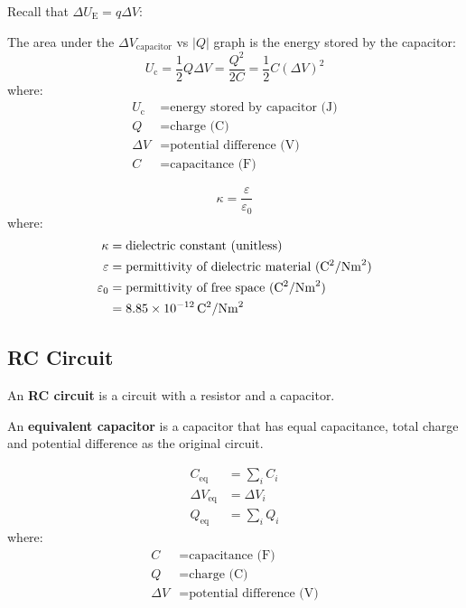\documentclass{article}
\newcommand{\definition}[1]{\begin{tcolorbox}[colback=red!5!white,colframe=red!75!black,parbox=false] #1 \end{tcolorbox}}
\newcommand{\theorem}[2]{\begin{tcolorbox}[title={#1},colback=blue!5!white,colframe=blue!75!black,parbox=false] #2 \end{tcolorbox}}
\begin{document}
Recall that $\Delta U_\text{E}=q\Delta V$:
\theorem{Energy of capacitor}{
	The area under the $\Delta V_\text{capacitor}$ vs $\left|Q\right|$ graph is the energy stored by the capacitor:
	\begin{equation*}
		U_\text{c}
		=\frac12 Q\Delta V
		=\frac{Q^2}{2C}
		=\frac12 C(\Delta V)^2
	\end{equation*}
	where:
	\begin{align*}
		U_\text{c}&=\text{energy stored by capacitor (J)} \\
		Q&=\text{charge (C)} \\
		\Delta V&=\text{potential difference (V)} \\
		C&=\text{capacitance (F)}
	\end{align*}
}

\theorem{Dielectric constant}{
	\begin{equation*}
	    \kappa=\frac{\varepsilon}{\varepsilon_0}
	\end{equation*}
	where:
	\begin{align*}
		\kappa
		&=\text{dielectric constant (unitless)} \\
		\varepsilon
		&=\text{permittivity of dielectric material (\si{\coulomb^2/\newton\meter^2})} \\
		\varepsilon_0
		&=\text{permittivity of free space (\si{\coulomb^2/\newton\meter^2})} \\
		&=8.85\times 10^{-12}\,\si{\coulomb^2/\newton\meter^2}
	\end{align*}
}

\subsection{RC Circuit}

\definition{An \textbf{RC circuit} is a circuit with a resistor and a capacitor.}

\definition{An \textbf{equivalent capacitor} is a capacitor that has equal capacitance, total charge and potential difference as the original circuit.}

\theorem{Capacitors in parallel}{
	\begin{align*}
		C_\text{eq}
		&=\sum_i C_i \\
		\Delta V_\text{eq}
		&=\Delta V_i \\
		Q_\text{eq}
		&=\sum_i Q_i
	\end{align*}
	where:
	\begin{align*}
		C
		&=\text{capacitance (F)} \\
		Q
		&=\text{charge (C)} \\
		\Delta V
		&=\text{potential difference (V)}
	\end{align*}
}
\end{document}
